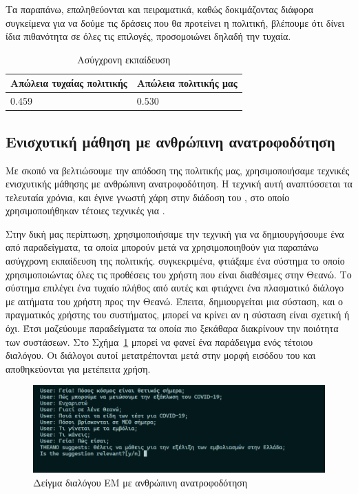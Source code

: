 Τα παραπάνω, επαληθεύονται και πειραματικά, καθώς δοκιμάζοντας διάφορα συγκείμενα για να δούμε τις δράσεις που θα προτείνει η πολιτική, βλέπουμε ότι δίνει ίδια πιθανότητα σε όλες τις επιλογές, προσομοιώνει δηλαδή την τυχαία.

\begin{table}
    \centering
    \begin{tabularx}{\textwidth}{|X|X|}
        \hline
        Απώλεια τυχαίας πολιτικής & Απώλεια πολιτικής μας \\
        \hline
        0.459                     & 0.530                 \\
        \hline
    \end{tabularx}
    \caption{Ασύγχρονη εκπαίδευση}
    \label{tab:offline_learning}
\end{table}

\subsection{Ενισχυτική μάθηση με ανθρώπινη ανατροφοδότηση}

Με σκοπό να βελτιώσουμε την απόδοση της πολιτικής μας, χρησιμοποιήσαμε τεχνικές ενισχυτικής μάθησης με ανθρώπινη ανατροφοδότηση. Η τεχνική αυτή αναπτύσσεται τα τελευταία χρόνια, και έγινε γνωστή χάρη στην διάδοση του , στο οποίο χρησιμοποιήθηκαν τέτοιες τεχνικές για \cite{chatgpt_2022}.

Στην δική μας περίπτωση, χρησιμοποιήσαμε την τεχνική για να δημιουργήσουμε ένα  από παραδείγματα, τα οποία μπορούν μετά να χρησιμοποιηθούν για παραπάνω ασύγχρονη εκπαίδευση της πολιτικής. συγκεκριμένα, φτιάξαμε ένα σύστημα το οποίο χρησιμοποιώντας όλες τις προθέσεις του χρήστη που είναι διαθέσιμες στην Θεανώ. Το σύστημα επιλέγει ένα τυχαίο πλήθος από αυτές και φτιάχνει ένα πλασματικό διάλογο με αιτήματα του χρήστη προς την Θεανώ. Έπειτα, δημιουργείται μια σύσταση, και ο πραγματικός χρήστης του συστήματος, μπορεί να κρίνει αν η σύσταση είναι σχετική ή όχι. Έτσι μαζεύουμε παραδείγματα τα οποία πιο ξεκάθαρα διακρίνουν την ποιότητα των συστάσεων. Στο Σχήμα~\ref{fig:rl_hf} μπορεί να φανεί ένα παράδειγμα ενός τέτοιου διαλόγου. Οι διάλογοι αυτοί μετατρέπονται μετά στην μορφή εισόδου του   και αποθηκεύονται για μετέπειτα χρήση.

\begin{figure}
    \centering
    \includegraphics[width=\textwidth]{body_matter/our_work/images/rlhf_sample.png}
    \caption{Δείγμα διαλόγου ΕΜ με ανθρώπινη ανατροφοδότηση}
    \label{fig:rl_hf}
\end{figure}

